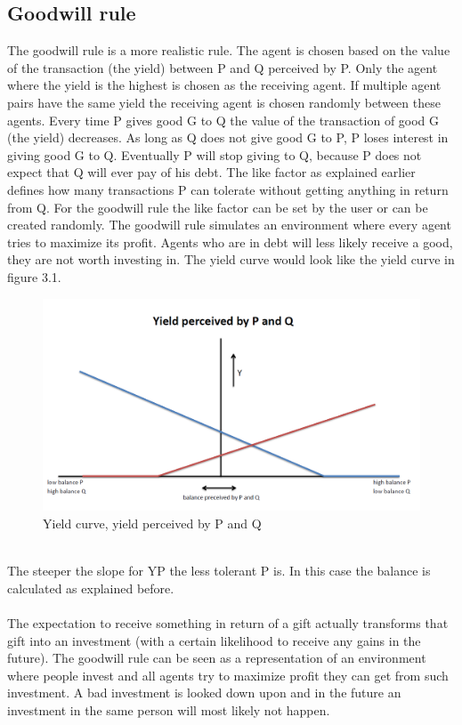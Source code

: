 \documentclass[twoside,openright]{uva-bachelor-thesis}
\begin{document}
\subsection{Goodwill rule}
The goodwill rule is a more realistic rule. The agent is chosen based on the value of the transaction (the yield) between P and Q perceived by P. Only the agent where the yield is the highest is chosen as the receiving agent. If multiple agent pairs have the same yield the receiving agent is chosen randomly between these agents. Every time P gives good G to Q the value of the transaction of good G (the yield) decreases. As long as Q does not give good G to P, P loses interest in giving good G to Q. Eventually P will stop giving to Q, because P does not expect that Q will ever pay of his debt. The like factor as explained earlier defines how many transactions P can tolerate without getting anything in return from Q. For the goodwill rule the like factor can be set by the user or can be created randomly. The goodwill rule simulates an environment where every agent tries to maximize its profit. Agents who are in debt will less likely receive a good, they are not worth investing in. The yield curve would look like the yield curve in figure 3.1.\\
\begin{figure}[h!]
\centering
\includegraphics[scale=0.4]{YieldCurves/yieldcurve_PQ} 
\caption{Yield curve, yield perceived by P and Q}
\end{figure}
\\
The steeper the slope for YP the less tolerant P is. In this case the balance is calculated as explained before.
\\
\\
The expectation to receive something in return of a gift actually transforms that gift into an investment (with a certain likelihood to receive any gains in the future). The goodwill rule can be seen as a representation of an environment where people invest and all agents try to maximize profit they can get from such investment. A bad investment is looked down upon and in the future an investment in the same person will most likely not happen.
\end{document}
